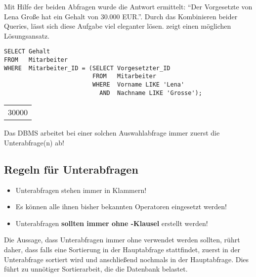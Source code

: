 Mit Hilfe der beiden Abfragen wurde die Antwort ermittelt: \enquote{Der Vorgesetzte von Lena Große hat ein Gehalt von 30.000 EUR.}. Durch das Kombinieren beider Queries, lässt sich diese Aufgabe viel eleganter lösen.  zeigt einen möglichen Lösungsansatz.
\begin{lstlisting}[language=oracle_sql,caption={Wie hoch ist das Gehalt des Vorgesetzten der Mitarbeiterin \textit{Lena Große}?},label=sql06_03]
SELECT Gehalt
FROM   Mitarbeiter
WHERE  Mitarbeiter_ID = (SELECT Vorgesetzter_ID
                         FROM   Mitarbeiter
                         WHERE  Vorname LIKE 'Lena'
                           AND  Nachname LIKE 'Grosse');
        \end{lstlisting}
\begin{center}
    \begin{small}
        \tablehead{}
        \begin{msoraclesql}
            \begin{supertabular}{r}
                30000 \\
            \end{supertabular}
        \end{msoraclesql}
    \end{small}
\end{center}
\begin{merke}
    Das DBMS arbeitet bei einer solchen Auswahlabfrage immer zuerst die Unterabfrage(n) ab!
\end{merke}
\subsection{Regeln für Unterabfragen}
\begin{itemize}
    \item Unterabfragen stehen immer in Klammern!
    \item Es können alle ihnen bisher bekannten Operatoren eingesetzt werden!
    \item Unterabfragen \textbf{sollten immer ohne \ORDERBY-Klausel} erstellt werden!
\end{itemize}
Die Aussage, dass Unterabfragen immer ohne \ORDERBY{} verwendet werden sollten, rührt daher, dass falls eine Sortierung in der Hauptabfrage stattfindet, zuerst in der Unterabfrage sortiert wird und anschließend nochmals in der Hauptabfrage. Dies führt zu unnötiger Sortierarbeit, die die Datenbank belastet.

